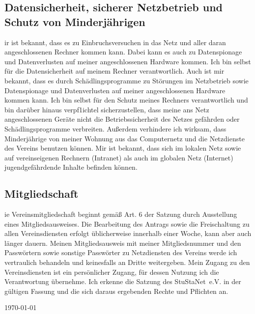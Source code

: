 \documentclass[a4paper,10pt]{scrartcl}
\begin{document}
\subsection*{Datensicherheit, sicherer Netzbetrieb und Schutz von Minderjährigen}
ir ist bekannt, dass es zu Einbruchsversuchen in das Netz und aller daran angeschlossenen Rechner kommen kann. Dabei kann es auch zu Datenspionage und Datenverlusten auf meiner angeschlossenen Hardware kommen. Ich bin selbst für die Datensicherheit auf meinem Rechner verantwortlich. Auch ist mir bekannt, dass es durch Schädlingsprogramme zu Störungen im Netzbetrieb sowie Datenspionage und Datenverlusten auf meiner angeschlossenen Hardware kommen kann. Ich bin selbst für den Schutz meines Rechners verantwortlich und bin darüber hinaus verpf1ichtel sicherzustellen, dass meine ans Netz angeschlossenen Geräte nicht die Betriebssicherheit des Netzes gefährden oder Schädlingsprogramme verbreiten. Außerdem verhindere ich wirksam, dass Minderjährige von meiner Wohnung aus das Computernetz und die Netzdienste des Vereins benutzen können. Mir ist bekannt, dass sich im lokalen Netz sowie auf vereinseigenen Rechnern (Intranet) als auch im globalen Netz (Internet) jugendgefährdende Inhalte befinden können.

\subsection*{Mitgliedschaft}
ie Vereinsmitgliedschaft beginnt gemäß Art. 6 der Satzung durch Ausstellung eines Mitgliedsausweises. Die Bearbeitung des Antrags sowie die Freischaltung zu allen Vereinsdiensten erfolgt üblicherweise innerhalb einer Woche, kann aber auch länger dauern. Meinen Mitgliedsausweis mit meiner Mitgliedsnummer und den Passwörtern sowie sonstige Passwörter zu Netzdiensten des Vereins werde ich vertraulich behandeln und keinesfalls an Dritte weitergeben. Mein Zugang zu den Vereinsdiensten ist ein persönlicher Zugang, für dessen Nutzung ich die Verantwortung übernehme. Ich erkenne die Satzung des StuStaNet~e.V. in der gültigen Fassung und die sich daraus ergebenden Rechte und Pflichten an.

\enlargethispage{40pt}
\medskip

\hfill\today

\newpage

\end{document}
